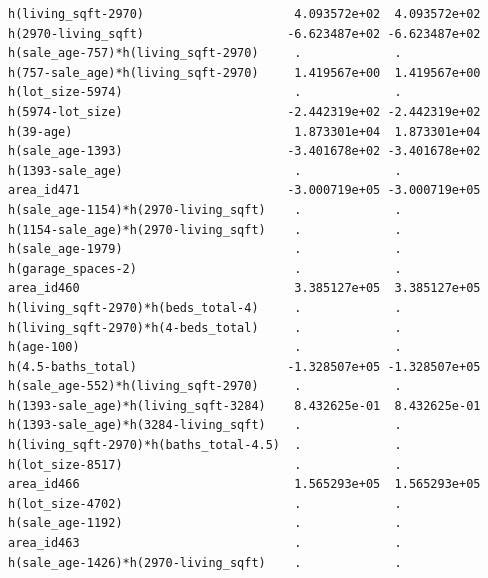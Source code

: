 \documentclass[
]{article}
\begin{document}
\begin{verbatim}
h(living_sqft-2970)                     4.093572e+02  4.093572e+02
h(2970-living_sqft)                    -6.623487e+02 -6.623487e+02
h(sale_age-757)*h(living_sqft-2970)     .             .           
h(757-sale_age)*h(living_sqft-2970)     1.419567e+00  1.419567e+00
h(lot_size-5974)                        .             .           
h(5974-lot_size)                       -2.442319e+02 -2.442319e+02
h(39-age)                               1.873301e+04  1.873301e+04
h(sale_age-1393)                       -3.401678e+02 -3.401678e+02
h(1393-sale_age)                        .             .           
area_id471                             -3.000719e+05 -3.000719e+05
h(sale_age-1154)*h(2970-living_sqft)    .             .           
h(1154-sale_age)*h(2970-living_sqft)    .             .           
h(sale_age-1979)                        .             .           
h(garage_spaces-2)                      .             .           
area_id460                              3.385127e+05  3.385127e+05
h(living_sqft-2970)*h(beds_total-4)     .             .           
h(living_sqft-2970)*h(4-beds_total)     .             .           
h(age-100)                              .             .           
h(4.5-baths_total)                     -1.328507e+05 -1.328507e+05
h(sale_age-552)*h(living_sqft-2970)     .             .           
h(1393-sale_age)*h(living_sqft-3284)    8.432625e-01  8.432625e-01
h(1393-sale_age)*h(3284-living_sqft)    .             .           
h(living_sqft-2970)*h(baths_total-4.5)  .             .           
h(lot_size-8517)                        .             .           
area_id466                              1.565293e+05  1.565293e+05
h(lot_size-4702)                        .             .           
h(sale_age-1192)                        .             .           
area_id463                              .             .           
h(sale_age-1426)*h(2970-living_sqft)    .             .           
                                                                  

\end{verbatim}
\end{document}
